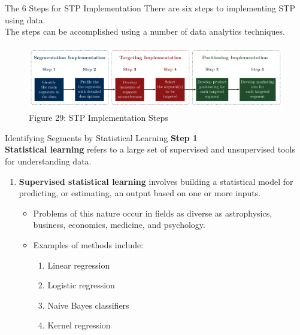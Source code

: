 \documentclass[pdf]{beamer}
\newcommand{\empr}[1]{{\color{franklinblue}\textbf{#1}}}
\theoremstyle{remark}
\theoremstyle{definition}
\begin{document}
\begin{frame}[t]{The 6 Steps for STP Implementation}
There are six steps to implementing STP using data. \\
\vspace{1.5ex}
The steps can be accomplished using a number of data analytics techniques.\\
 \vspace{0.0ex}
\begin{figure}[htbp]
  \captionsetup{justification=centering}
  \includegraphics[height=2.8cm, trim=1.0cm 0.0cm 0.0cm 0.0cm width=2.8cm]{STP_Process.pdf}
  \caption{Figure {\color{franklinblue} 29}: STP Implementation Steps}
\end{figure}
\end{frame}

\begin{frame}[t]{Identifying Segments by Statistical Learning}
\textbf{\color{franklinblue} Step 1} \\
\vspace{1.5ex}
\empr{Statistical learning} refers to a large set of supervised and unsupervised tools for understanding data. 
\begin{enumerate}
\item \empr{Supervised statistical learning} involves building a statistical model for predicting, or estimating, an output based on one or more inputs. 
\begin{itemize}
\item Problems of this nature occur in fields as diverse as astrophysics, business, economics, medicine, and psychology. 
\item Examples of methods include:
\begin{enumerate}
  \item Linear regression
  \item Logistic regression
  \item Naive Bayes classifiers 
  \item Kernel regression
\end{enumerate}
\end{itemize}
\end{enumerate}
\end{frame}
\end{document}
